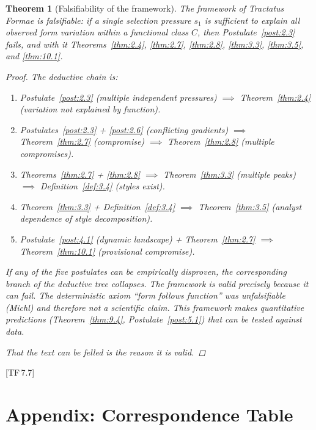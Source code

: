 \documentclass[11pt, a4paper]{article}
\theoremstyle{definition}
\theoremstyle{plain}
\newtheorem{theorem}[definition]{Theorem}
\theoremstyle{remark}
\newcommand{\TF}[1]{\textnormal{[TF\,#1]}}  %
\begin{document}
\begin{theorem}[Falsifiability of the framework]\label{thm:10.3}
The framework of Tractatus Formae is falsifiable: if a single selection
pressure $s_1$ is sufficient to explain all observed form variation
within a functional class $C$, then Postulate~\ref{post:2.3} fails, and
with it Theorems~\ref{thm:2.4}, \ref{thm:2.7}, \ref{thm:2.8},
\ref{thm:3.3}, \ref{thm:3.5}, and \ref{thm:10.1}.

\begin{proof}
The deductive chain is:
\begin{enumerate}[nosep]
  \item Postulate~\ref{post:2.3} (multiple independent pressures)
    $\implies$ Theorem~\ref{thm:2.4} (variation not explained by
    function).
  \item Postulates~\ref{post:2.3} + \ref{post:2.6} (conflicting
    gradients) $\implies$ Theorem~\ref{thm:2.7} (compromise) $\implies$
    Theorem~\ref{thm:2.8} (multiple compromises).
  \item Theorems~\ref{thm:2.7} + \ref{thm:2.8} $\implies$
    Theorem~\ref{thm:3.3} (multiple peaks) $\implies$
    Definition~\ref{def:3.4} (styles exist).
  \item Theorem~\ref{thm:3.3} + Definition~\ref{def:3.4} $\implies$
    Theorem~\ref{thm:3.5} (analyst dependence of style decomposition).
  \item Postulate~\ref{post:4.1} (dynamic landscape) + Theorem~\ref{thm:2.7}
    $\implies$ Theorem~\ref{thm:10.1} (provisional compromise).
\end{enumerate}

If any of the five postulates can be empirically disproven, the
corresponding branch of the deductive tree collapses. The framework
is valid precisely because it can fail. The deterministic axiom
``form follows function'' was unfalsifiable (Michl) and therefore
not a scientific claim. This framework makes quantitative predictions
(Theorem~\ref{thm:9.4}, Postulate~\ref{post:5.1}) that can be tested
against data.

That the text \emph{can} be felled is the reason it is valid.
\qedhere
\end{proof}
\end{theorem}

\TF{7.7}


\newpage
\section*{Appendix: Correspondence Table}
\end{document}
